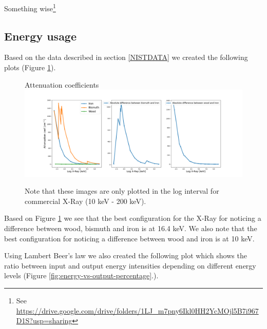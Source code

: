 \documentclass{article}
\begin{document}
Something wise\footnote{See \url{https://drive.google.com/drive/folders/1LJ_m7pny6Ikl0HH2YcMOjl5B7i967D1S?usp=sharing}}

\subsection{Energy usage}\label{sec:energy-usage}
Based on the data described in section \ref{NISTDATA} we created the following plots (Figure \ref{fig:both-attenuation-coeff-plots}).
\begin{figure}[H]
    \centering
    \large{Attenuation coefficients} \\
    \includegraphics[scale=0.3]{images/combined-plot-attenuation.png}
    \caption{\small Note that these images are only plotted in the log interval for commercial X-Ray (10 keV - 200 keV).}
    \label{fig:both-attenuation-coeff-plots}
\end{figure}

Based on Figure \ref{fig:both-attenuation-coeff-plots} we see that the best configuration for the X-Ray for noticing a difference between wood, bismuth and iron is at 16.4 keV. We also note that the best configuration for noticing a difference between wood and iron is at 10 keV.  

Using Lambert Beer's law we also created the following plot which shows the ratio between input and output energy intensities depending on different energy levels (Figure \ref{fig:energy-vs-output-percentage}.). 
\end{document}
